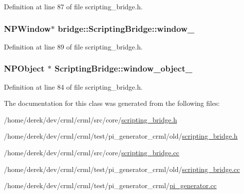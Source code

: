 Definition at line 87 of file scripting\_\-bridge.h.

\hypertarget{classbridge_1_1_scripting_bridge_ab23772fde4cbff4bc65520d589c8adac}{
\subsubsection[{window\_\-}]{\setlength{\rightskip}{0pt plus 5cm}NPWindow$\ast$ {\bf bridge::ScriptingBridge::window\_\-}}}
\label{classbridge_1_1_scripting_bridge_ab23772fde4cbff4bc65520d589c8adac}


Definition at line 89 of file scripting\_\-bridge.h.

\hypertarget{classbridge_1_1_scripting_bridge_a59bc10d2500b138998dc973aee38039e}{
\subsubsection[{window\_\-object\_\-}]{\setlength{\rightskip}{0pt plus 5cm}NPObject $\ast$ {\bf ScriptingBridge::window\_\-object\_\-}}}
\label{classbridge_1_1_scripting_bridge_a59bc10d2500b138998dc973aee38039e}


Definition at line 84 of file scripting\_\-bridge.h.



The documentation for this class was generated from the following files:\begin{DoxyCompactItemize}
\item 
/home/derek/dev/crml/crml/src/core/\hyperlink{src_2core_2scripting__bridge_8h}{scripting\_\-bridge.h}\item 
/home/derek/dev/crml/crml/test/pi\_\-generator\_\-crml/old/\hyperlink{test_2pi__generator__crml_2old_2scripting__bridge_8h}{scripting\_\-bridge.h}\item 
/home/derek/dev/crml/crml/src/core/\hyperlink{src_2core_2scripting__bridge_8cc}{scripting\_\-bridge.cc}\item 
/home/derek/dev/crml/crml/test/pi\_\-generator\_\-crml/old/\hyperlink{test_2pi__generator__crml_2old_2scripting__bridge_8cc}{scripting\_\-bridge.cc}\item 
/home/derek/dev/crml/crml/test/pi\_\-generator\_\-crml/\hyperlink{pi__generator__crml_2pi__generator_8cc}{pi\_\-generator.cc}\end{DoxyCompactItemize}
